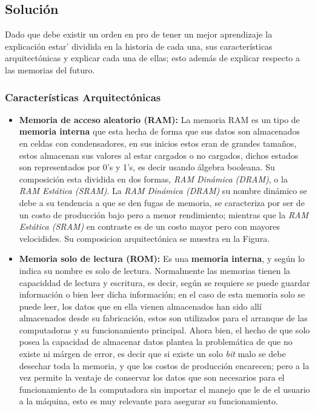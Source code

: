 \documentclass[conference]{IEEEtran}
\begin{document}
\subsection{Soluci\'on} %
Dado que debe existir un orden en pro de tener un mejor aprendizaje la explicaci\'on estar\a'
dividida en la historia de cada una, sus caracter\'isticas arquitect\'onicas y explicar cada
una de ellas; esto adem\'as de explicar respecto a las memorias del futuro.

\subsubsection{Caracter\'isticas Arquitect\'onicas} %
\begin{itemize}
    \item \textbf{Memoria de acceso aleatorio (RAM):} La memoria RAM es un tipo de
    \textbf{memoria interna} que esta hecha de forma que sus datos son almacenados en 
    celdas con condensadores, en sus inicios estos eran de grandes tama\~nos, estos almacenan
    sus valores al estar cargados o no cargados, dichos estados son representados por 0's y 1's,
    es decir usando \'algebra booleana. Su composici\'on esta dividida en dos formas,
    \textit{RAM Din\'amica (DRAM)}, o la \textit{RAM Est\'atica (SRAM)}.
    La \textit{RAM Din\'amica (DRAM)} su nombre din\'amico se debe a su tendencia a que se den
    fugas de memoria, se caracteriza por ser de un costo de producci\'on bajo pero a menor
    rendimiento; mientras que la \textit{RAM Est\'atica (SRAM)} en contraste es de un costo mayor
    pero con mayores velocidides. Su composicion arquitect\'onica se muestra en la Figura.
    
    \item \textbf{Memoria solo de lectura (ROM):} Es una \textbf{memoria interna}, y seg\'un lo
    indica su nombre es solo de lectura. Normalmente las memorias tienen la capaciddad de lectura
    y escritura, es decir, seg\'un se requiere se puede guardar informaci\'on o bien leer dicha
    informaci\'on; en el caso de esta memoria solo se puede leer, los datos que en ella vienen
    almacenados han sido all\'i almacenados desde su fabricaci\'on, estos son utilizados para el
    arranque de las computadoras y su funcionamiento principal. Ahora bien, el hecho de que solo
    posea la capacidad de almacenar datos plantea la problem\'atica de que no existe ni m\'argen
    de error, es decir que si existe un solo \textit{bit} malo se debe desechar toda la memoria,
    y que los costos de producci\'on encarecen; pero a la vez permite la ventaje de conservar los
    datos que son necesarios para el funcionamiento de la computadora sin importar el manejo que
    le de el usuario a la m\'aquina, esto es muy relevante para asegurar su funcionamiento.
    

\end{itemize}
\end{document}
